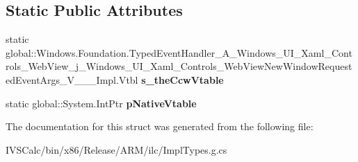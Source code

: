 \subsection*{Static Public Attributes}
\begin{DoxyCompactItemize}
\item 
\mbox{\label{struct_windows_1_1_foundation_1_1_typed_event_handler___a___windows___u_i___xaml___controls___wec42a721acbd095ac78e4a49a8bbda864_a7ba06dc8be52aed53deef614d12dcdf9}} 
static global\+::\+Windows.\+Foundation.\+Typed\+Event\+Handler\+\_\+\+A\+\_\+\+Windows\+\_\+\+U\+I\+\_\+\+Xaml\+\_\+\+Controls\+\_\+\+Web\+View\+\_\+j\+\_\+\+Windows\+\_\+\+U\+I\+\_\+\+Xaml\+\_\+\+Controls\+\_\+\+Web\+View\+New\+Window\+Requested\+Event\+Args\+\_\+\+V\+\_\+\+\_\+\+\_\+\+Impl.\+Vtbl {\bfseries s\+\_\+the\+Ccw\+Vtable}
\item 
\mbox{\label{struct_windows_1_1_foundation_1_1_typed_event_handler___a___windows___u_i___xaml___controls___wec42a721acbd095ac78e4a49a8bbda864_a2bab6a1f0f2ab61a427a6f60cb28ef31}} 
static global\+::\+System.\+Int\+Ptr {\bfseries p\+Native\+Vtable}
\end{DoxyCompactItemize}


The documentation for this struct was generated from the following file\+:\begin{DoxyCompactItemize}
\item 
I\+V\+S\+Calc/bin/x86/\+Release/\+A\+R\+M/ilc/Impl\+Types.\+g.\+cs\end{DoxyCompactItemize}
